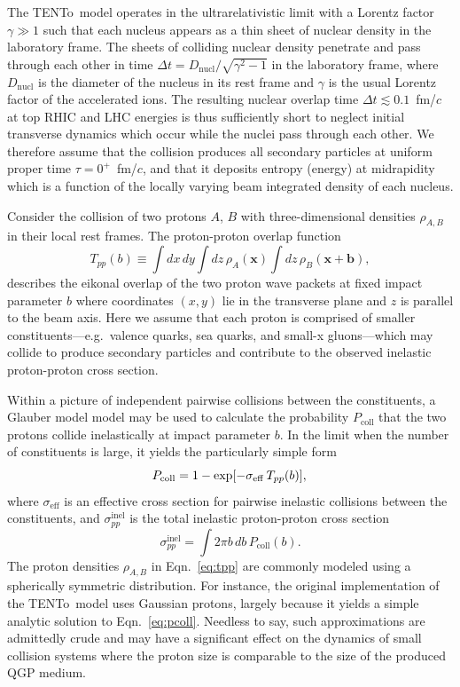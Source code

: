 \documentclass[aps,prc,reprint,amsmath,nofootinbib]{revtex4-1}
\newcommand{\trento}{T\raisebox{-0.5ex}{R}ENTo}
\newcommand{\x}{\mathbf x}
\begin{document}
The \trento\ model operates in the ultrarelativistic limit with a Lorentz factor $\gamma \gg 1$ such that each nucleus appears as a thin sheet of nuclear density in the laboratory frame.
The sheets of colliding nuclear density penetrate and pass through each other in time $\Delta t = D_\text{nucl} / \sqrt{\gamma^2 - 1}$ in the laboratory frame, where $D_\text{nucl}$ is the diameter of the nucleus in its rest frame and $\gamma$ is the usual Lorentz factor of the accelerated ions.
The resulting nuclear overlap time $\Delta t \lesssim 0.1$~fm/$c$ at top RHIC and LHC energies is thus sufficiently short to neglect initial transverse dynamics which occur while the nuclei pass through each other.
We therefore assume that the collision produces all secondary particles at uniform proper time $\tau = 0^+$~fm/$c$, and that it deposits entropy (energy) at midrapidity which is a function of the locally varying beam integrated density of each nucleus.

Consider the collision of two protons $A$, $B$ with three-dimensional densities $\rho_{A,B}$ in their local rest frames.
The proton-proton overlap function
\begin{equation}
  \label{eq:tpp}
  T_{pp}(b) \equiv \int dx\, dy \int dz\, \rho_A(\x) \int dz\, \rho_B(\x + \mathbf{b}),
\end{equation}
describes the eikonal overlap of the two proton wave packets at fixed impact parameter $b$ where coordinates $(x, y)$ lie in the transverse plane and $z$ is parallel to the beam axis.
Here we assume that each proton is comprised of smaller constituents---e.g.\ valence quarks, sea quarks, and small-x gluons---which may collide to produce secondary particles and contribute to the observed inelastic proton-proton cross section.

Within a picture of independent pairwise collisions between the constituents, a Glauber model model may be used to calculate the probability $P_\mathrm{coll}$ that the two protons collide inelastically at impact parameter $b$. In the limit when the number of constituents is large, it yields the particularly simple form
\begin{equation}
  \label{eq:pcoll}
  P_\mathrm{coll} = 1 - \exp[-\sigma_\mathrm{eff}\, T_{pp}(b)], \\
\end{equation}
where $\sigma_\mathrm{eff}$ is an effective cross section for pairwise inelastic collisions between the constituents, and $\sigma_{pp}^\mathrm{inel}$ is the total inelastic proton-proton cross section
\begin{equation}
  \label{eq:sigma_nn}
  \sigma_{pp}^\mathrm{inel} = \int 2 \pi b\, db\, P_\mathrm{coll}(b).
\end{equation}
The proton densities $\rho_{A,B}$ in Eqn.~\eqref{eq:tpp} are commonly modeled using a spherically symmetric distribution.
For instance, the original implementation of the \trento\ model uses Gaussian protons, largely because it yields a simple analytic solution to Eqn.~\eqref{eq:pcoll}.
Needless to say, such approximations are admittedly crude and may have a significant effect on the dynamics of small collision systems where the proton size is comparable to the size of the produced QGP medium.
\end{document}
